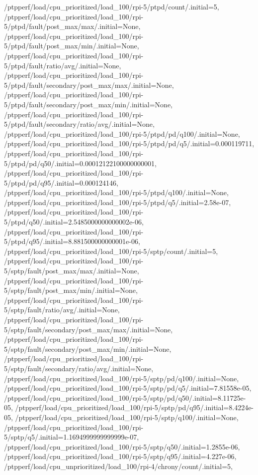 {    /ptpperf/load/cpu_prioritized/load_100/rpi-5/ptpd/count/.initial=5,
    /ptpperf/load/cpu_prioritized/load_100/rpi-5/ptpd/fault/post_max/max/.initial=None,
    /ptpperf/load/cpu_prioritized/load_100/rpi-5/ptpd/fault/post_max/min/.initial=None,
    /ptpperf/load/cpu_prioritized/load_100/rpi-5/ptpd/fault/ratio/avg/.initial=None,
    /ptpperf/load/cpu_prioritized/load_100/rpi-5/ptpd/fault/secondary/post_max/max/.initial=None,
    /ptpperf/load/cpu_prioritized/load_100/rpi-5/ptpd/fault/secondary/post_max/min/.initial=None,
    /ptpperf/load/cpu_prioritized/load_100/rpi-5/ptpd/fault/secondary/ratio/avg/.initial=None,
    /ptpperf/load/cpu_prioritized/load_100/rpi-5/ptpd/pd/q100/.initial=None,
    /ptpperf/load/cpu_prioritized/load_100/rpi-5/ptpd/pd/q5/.initial=0.000119711,
    /ptpperf/load/cpu_prioritized/load_100/rpi-5/ptpd/pd/q50/.initial=0.00012122100000000001,
    /ptpperf/load/cpu_prioritized/load_100/rpi-5/ptpd/pd/q95/.initial=0.000124146,
    /ptpperf/load/cpu_prioritized/load_100/rpi-5/ptpd/q100/.initial=None,
    /ptpperf/load/cpu_prioritized/load_100/rpi-5/ptpd/q5/.initial=2.58e-07,
    /ptpperf/load/cpu_prioritized/load_100/rpi-5/ptpd/q50/.initial=2.5485000000000002e-06,
    /ptpperf/load/cpu_prioritized/load_100/rpi-5/ptpd/q95/.initial=8.881500000000001e-06,
    /ptpperf/load/cpu_prioritized/load_100/rpi-5/sptp/count/.initial=5,
    /ptpperf/load/cpu_prioritized/load_100/rpi-5/sptp/fault/post_max/max/.initial=None,
    /ptpperf/load/cpu_prioritized/load_100/rpi-5/sptp/fault/post_max/min/.initial=None,
    /ptpperf/load/cpu_prioritized/load_100/rpi-5/sptp/fault/ratio/avg/.initial=None,
    /ptpperf/load/cpu_prioritized/load_100/rpi-5/sptp/fault/secondary/post_max/max/.initial=None,
    /ptpperf/load/cpu_prioritized/load_100/rpi-5/sptp/fault/secondary/post_max/min/.initial=None,
    /ptpperf/load/cpu_prioritized/load_100/rpi-5/sptp/fault/secondary/ratio/avg/.initial=None,
    /ptpperf/load/cpu_prioritized/load_100/rpi-5/sptp/pd/q100/.initial=None,
    /ptpperf/load/cpu_prioritized/load_100/rpi-5/sptp/pd/q5/.initial=7.81558e-05,
    /ptpperf/load/cpu_prioritized/load_100/rpi-5/sptp/pd/q50/.initial=8.11725e-05,
    /ptpperf/load/cpu_prioritized/load_100/rpi-5/sptp/pd/q95/.initial=8.4224e-05,
    /ptpperf/load/cpu_prioritized/load_100/rpi-5/sptp/q100/.initial=None,
    /ptpperf/load/cpu_prioritized/load_100/rpi-5/sptp/q5/.initial=1.1694999999999999e-07,
    /ptpperf/load/cpu_prioritized/load_100/rpi-5/sptp/q50/.initial=1.2855e-06,
    /ptpperf/load/cpu_prioritized/load_100/rpi-5/sptp/q95/.initial=4.227e-06,
    /ptpperf/load/cpu_unprioritized/load_100/rpi-4/chrony/count/.initial=5,
}
